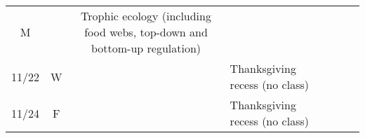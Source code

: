 \documentclass[]{article}
\begin{document}
\begin{longtable}[]{@{}cccllll@{}}
\begin{minipage}[t]{0.07\columnwidth}
M\strut
\end{minipage} & \begin{minipage}[t]{0.10\columnwidth}\raggedright\strut
\strut
\end{minipage} & \begin{minipage}[t]{0.11\columnwidth}\raggedright\strut
Trophic ecology (including food webs, top-down and bottom-up
regulation)\strut
\end{minipage} & \begin{minipage}[t]{0.11\columnwidth}\raggedright\strut
\strut
\end{minipage} & \begin{minipage}[t]{0.16\columnwidth}\raggedright\strut
\strut
\end{minipage}\tabularnewline
\begin{minipage}[t]{0.12\columnwidth}\centering\strut
11/22\strut
\end{minipage} & \begin{minipage}[t]{0.08\columnwidth}\centering\strut
W\strut
\end{minipage} & \begin{minipage}[t]{0.07\columnwidth}\centering\strut
\strut
\end{minipage} & \begin{minipage}[t]{0.10\columnwidth}\raggedright\strut
Thanksgiving recess (no class)\strut
\end{minipage} & \begin{minipage}[t]{0.11\columnwidth}\raggedright\strut
\strut
\end{minipage} & \begin{minipage}[t]{0.11\columnwidth}\raggedright\strut
\strut
\end{minipage} & \begin{minipage}[t]{0.16\columnwidth}\raggedright\strut
\strut
\end{minipage}\tabularnewline
\begin{minipage}[t]{0.12\columnwidth}\centering\strut
11/24\strut
\end{minipage} & \begin{minipage}[t]{0.08\columnwidth}\centering\strut
F\strut
\end{minipage} & \begin{minipage}[t]{0.07\columnwidth}\centering\strut
\strut
\end{minipage} & \begin{minipage}[t]{0.10\columnwidth}\raggedright\strut
Thanksgiving recess (no class)\strut
\end{minipage} & \begin{minipage}[t]{0.11\columnwidth}\raggedright\strut

\end{minipage}
\end{longtable}
\end{document}
